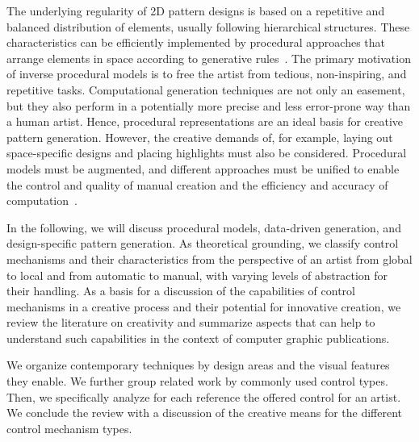 The underlying regularity of 2D pattern designs is based on a repetitive and balanced distribution of elements, usually following hierarchical structures. These characteristics can be efficiently implemented by procedural approaches that arrange elements in space according to generative rules~\cite{stava_2010_ipm}.  The primary motivation of inverse procedural models is to free the artist from tedious, non-inspiring, and repetitive tasks. Computational generation techniques are not only an easement, but they also perform in a potentially more precise and less error-prone way than a human artist. Hence, procedural representations are an ideal basis for creative pattern generation. 
However, the creative demands of, for example, laying out space-specific designs and placing highlights must also be considered. Procedural models must be augmented, and different approaches must be unified to enable the control and quality of manual creation and the efficiency and accuracy of computation~\cite{gieseke_2017_ooo}. 

In the following, we will discuss procedural models, data-driven generation, and design-specific pattern generation. As theoretical grounding, we classify control mechanisms and their characteristics from the perspective of an artist from global to local and from automatic to manual, with varying levels of abstraction for their handling. As a basis for a discussion of the capabilities of control mechanisms in a creative process and their potential for innovative creation, we review the literature on creativity and summarize aspects that can help to understand such capabilities in the context of computer graphic publications.

We organize contemporary techniques by design areas and the visual features they enable. We further group related work by commonly used control types. Then, we specifically analyze for each reference the offered control for an artist. 
We conclude the review with a discussion of the creative means for the different control mechanism types.

